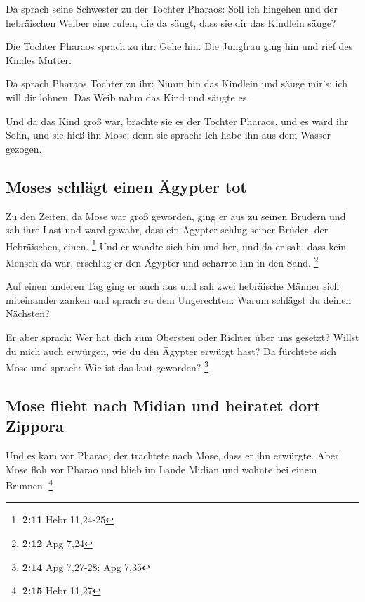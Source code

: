  Da sprach seine Schwester zu der Tochter Pharaos: Soll
ich hingehen und der hebräischen Weiber eine rufen, die da säugt, dass
sie dir das Kindlein säuge?

 Die Tochter Pharaos sprach zu ihr: Gehe hin. Die Jungfrau
ging hin und rief des Kindes Mutter.

 Da sprach Pharaos Tochter zu ihr: Nimm hin das Kindlein
und säuge mir's; ich will dir lohnen. Das Weib nahm das Kind und säugte
es.

 Und da das Kind groß war, brachte sie es der Tochter
Pharaos, und es ward ihr Sohn, und sie hieß ihn Mose; denn sie sprach:
Ich habe ihn aus dem Wasser gezogen.

\hypertarget{moses-schluxe4gt-einen-uxe4gypter-tot}{%
\subsection{Moses schlägt einen Ägypter
tot}\label{moses-schluxe4gt-einen-uxe4gypter-tot}}

 Zu den Zeiten, da Mose war groß geworden, ging er aus zu
seinen Brüdern und sah ihre Last und ward gewahr, dass ein Ägypter
schlug seiner Brüder, der Hebräischen, einen. \footnote{\textbf{2:11}
  Hebr 11,24-25}  Und er wandte sich hin und her, und da
er sah, dass kein Mensch da war, erschlug er den Ägypter und scharrte
ihn in den Sand. \footnote{\textbf{2:12} Apg 7,24}

 Auf einen anderen Tag ging er auch aus und sah zwei
hebräische Männer sich miteinander zanken und sprach zu dem Ungerechten:
Warum schlägst du deinen Nächsten?

 Er aber sprach: Wer hat dich zum Obersten oder Richter
über uns gesetzt? Willst du mich auch erwürgen, wie du den Ägypter
erwürgt hast? Da fürchtete sich Mose und sprach: Wie ist das laut
geworden? \footnote{\textbf{2:14} Apg 7,27-28; Apg 7,35}

\hypertarget{mose-flieht-nach-midian-und-heiratet-dort-zippora}{%
\subsection{Mose flieht nach Midian und heiratet dort
Zippora}\label{mose-flieht-nach-midian-und-heiratet-dort-zippora}}

 Und es kam vor Pharao; der trachtete nach Mose, dass er
ihn erwürgte. Aber Mose floh vor Pharao und blieb im Lande Midian und
wohnte bei einem Brunnen. \footnote{\textbf{2:15} Hebr 11,27}

